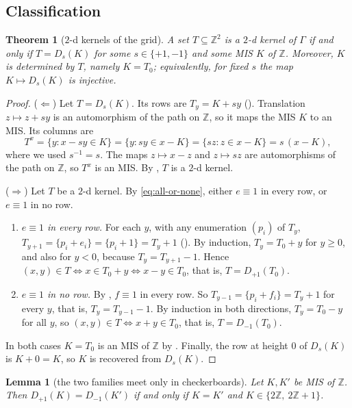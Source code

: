 \documentclass[11pt]{article}
\theoremstyle{plain}
\newtheorem{theorem}{Theorem}[section]
\newtheorem{lemma}[lemma]{Lemma}
\theoremstyle{definition}
\theoremstyle{remark}
\newcommand{\Z}{\mathbb{Z}}
\newcommand{\Dg}[2]{D_{#1}(#2)}
\begin{document}
\subsection{Classification}

\begin{theorem}[$2$-d kernels of the grid]\label{thm:grid}
A set $T \subseteq \Z^2$ is a $2$-d kernel of $\Gamma$ if and only if $T = \Dg{s}{K}$ for some
$s \in \{+1,-1\}$ and some MIS $K$ of $\Z$. Moreover, $K$ is determined by $T$, namely
$K = T_0$; equivalently, for fixed $s$ the map $K \mapsto \Dg{s}{K}$ is injective.
\end{theorem}

\begin{proof}
($\Leftarrow$) Let $T = \Dg{s}{K}$. Its rows are $T_y = K + sy$ ().
Translation $z \mapsto z + sy$ is an automorphism of the path on $\Z$, so it maps the MIS
$K$ to an MIS. Its columns are
\[
T^x = \{y : x - sy \in K\} = \{y : sy \in x - K\} = \{s z : z \in x - K\} = s\,(x - K),
\]
where we used $s^{-1} = s$. The maps $z \mapsto x - z$ and $z \mapsto sz$ are automorphisms of
the path on $\Z$, so $T^x$ is an MIS. By , $T$ is a $2$-d kernel.

($\Rightarrow$) Let $T$ be a $2$-d kernel. By \eqref{eq:all-or-none}, either $e \equiv 1$ in
every row, or $e \equiv 1$ in no row.
\begin{enumerate}[label=(\roman*)]
  \item \emph{$e \equiv 1$ in every row.} For each $y$, with any enumeration $(p_i)$ of
        $T_y$, $T_{y+1} = \{p_i + e_i\} = \{p_i + 1\} = T_y + 1$ (). By
        induction, $T_y = T_0 + y$ for $y \ge 0$, and also for $y < 0$, because
        $T_{y} = T_{y+1} - 1$. Hence $(x,y) \in T \iff x \in T_0 + y \iff x - y \in T_0$,
        that is, $T = \Dg{+1}{T_0}$.
  \item \emph{$e \equiv 1$ in no row.} By , $f \equiv 1$ in every row.
        So $T_{y-1} = \{p_i + f_i\} = T_y + 1$ for every $y$, that is, $T_y = T_{y-1} - 1$.
        By induction in both directions, $T_y = T_0 - y$ for all $y$, so
        $(x,y) \in T \iff x + y \in T_0$, that is, $T = \Dg{-1}{T_0}$.
\end{enumerate}
In both cases $K = T_0$ is an MIS of $\Z$ by . Finally, the row at height $0$ of
$\Dg{s}{K}$ is $K + 0 = K$, so $K$ is recovered from $\Dg{s}{K}$.
\end{proof}

\begin{lemma}[the two families meet only in checkerboards]\label{lem:overlap}
Let $K, K'$ be MIS of $\Z$. Then $\Dg{+1}{K} = \Dg{-1}{K'}$ if and only if $K = K'$ and
$K \in \{2\Z,\ 2\Z + 1\}$.
\end{lemma}
\end{document}
